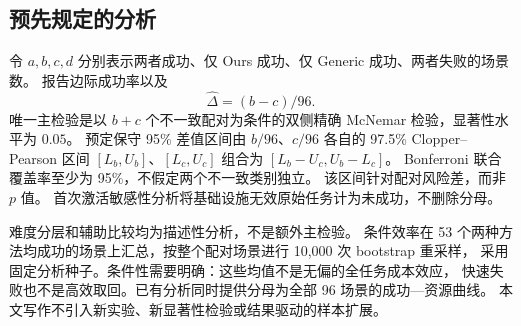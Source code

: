 \subsection{预先规定的分析}
\label{sec:analysis}
令 $a,b,c,d$ 分别表示两者成功、仅 Ours 成功、仅 Generic 成功、两者失败的场景数。
报告边际成功率以及
\begin{equation}
\widehat\Delta=(b-c)/96.
\label{eq:effect}
\end{equation}
唯一主检验是以 $b+c$ 个不一致配对为条件的双侧精确 McNemar 检验，显著性水平为 $0.05$。
预定保守 95\% 差值区间由 $b/96$、$c/96$ 各自的 97.5\% Clopper--Pearson 区间
$[L_b,U_b]$、$[L_c,U_c]$ 组合为 $[L_b-U_c,U_b-L_c]$。
Bonferroni 联合覆盖率至少为 95\%，不假定两个不一致类别独立。
该区间针对配对风险差，而非 $p$ 值。
首次激活敏感性分析将基础设施无效原始任务计为未成功，不删除分母。

难度分层和辅助比较均为描述性分析，不是额外主检验。
条件效率在 53 个两种方法均成功的场景上汇总，按整个配对场景进行 10,000 次 bootstrap 重采样，
采用固定分析种子。条件性需要明确：这些均值不是无偏的全任务成本效应，
快速失败也不是高效取回。已有分析同时提供分母为全部 96 场景的成功—资源曲线。
本文写作不引入新实验、新显著性检验或结果驱动的样本扩展。
